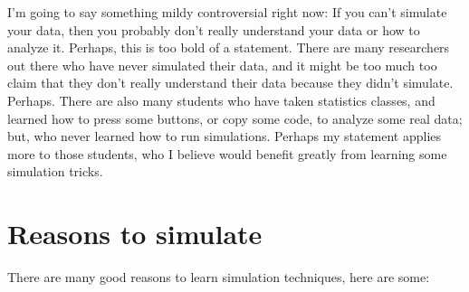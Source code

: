 \documentclass[
]{book}
\begin{document}
I'm going to say something mildy controversial right now: If you can't simulate your data, then you probably don't really understand your data or how to analyze it. Perhaps, this is too bold of a statement. There are many researchers out there who have never simulated their data, and it might be too much too claim that they don't really understand their data because they didn't simulate. Perhaps. There are also many students who have taken statistics classes, and learned how to press some buttons, or copy some code, to analyze some real data; but, who never learned how to run simulations. Perhaps my statement applies more to those students, who I believe would benefit greatly from learning some simulation tricks.

\hypertarget{reasons-to-simulate}{%
\section{Reasons to simulate}\label{reasons-to-simulate}}

There are many good reasons to learn simulation techniques, here are some:
\end{document}
